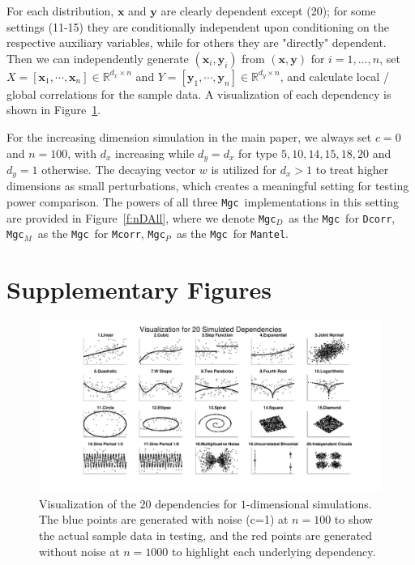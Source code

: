 \documentclass[11pt]{article}
\providecommand{\sct}[1]{{\sc \texttt{#1}}}
\providecommand{\mb}[1]{\boldsymbol{#1}}
\newcommand{\Real}{\mathbb{R}}
\newcommand{\Mgc}{\sct{Mgc}}
\newcommand{\Mgcp}{\sct{Mgc$_P$}}
\newcommand{\Mgcd}{\sct{Mgc$_D$}}
\newcommand{\Mgcm}{\sct{Mgc$_M$}}
\newcommand{\Dcorr}{\sct{Dcorr}}
\newcommand{\Mcorr}{\sct{Mcorr}}
\newcommand{\Mantel}{\sct{Mantel}}
\newcommand{\mbx}{\ensuremath{\mb{x}}}
\newcommand{\mby}{\ensuremath{\mb{y}}}
\begin{document}
For each distribution, $\mb{x}$ and $\mb{y}$ are clearly dependent except  (20); for some settings (11-15) they are conditionally independent upon conditioning on the respective auxiliary variables, while for others they are "directly" dependent. Then we can independently generate $(\mbx_{i},\mby_{i})$ from $(\mb{x},\mb{y})$ for $i=1,\ldots,n$, set $X=[\mbx_{1},\cdots, \mbx_{n}] \in \Real^{d_{x} \times n}$ and $Y=[\mby_{1},\cdots, \mby_{n}] \in \Real^{d_{y} \times n}$, and calculate local / global correlations for the sample data. A visualization of each dependency is shown in Figure~\ref{f:dependencies}.


For the increasing dimension simulation in the main paper, we always set $c=0$ and $n=100$, with $d_{x}$ increasing while $d_{y}=d_{x}$ for type $5,10,14,15,18,20$ and $d_{y}=1$ otherwise. The decaying vector $w$ is utilized for $d_{x}>1$ to treat higher dimensions as small perturbations, which creates a meaningful setting for testing power comparison. The powers of all three \Mgc~implementations in this setting are provided in Figure~\ref{f:nDAll}, where we denote \Mgcd~as the \Mgc~for \Dcorr, \Mgcm~as the \Mgc~for \Mcorr, \Mgcp~as the \Mgc~for \Mantel.

\section{Supplementary Figures}
\label{appen:figs}


\begin{figure}[htbp]
\includegraphics[trim={5cm 0 3.5cm 0},clip, width=1.0\textwidth]{../Figures/FigSimVisual}
\caption{Visualization of the $20$ dependencies for $1$-dimensional simulations. The blue points are generated with noise (c=1) at $n=100$ to show the actual sample data in testing, and the red points are generated without noise at $n=1000$ to highlight each underlying dependency.
}
\label{f:dependencies}
\end{figure}
\end{document}
